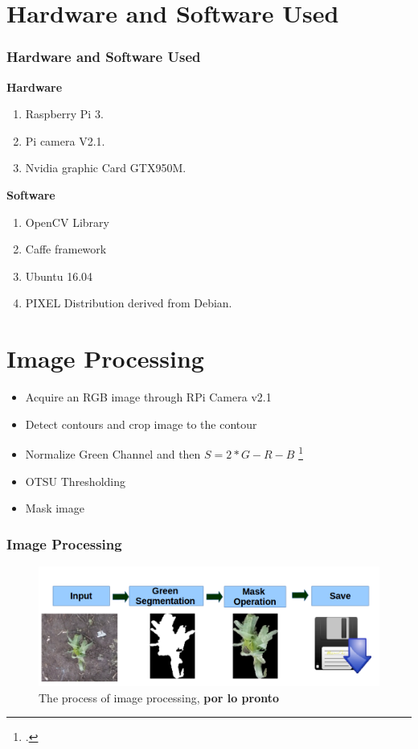 \documentclass[10pt,a4paper]{beamer}
\begin{document}
\section{Hardware and Software Used}
\begin{frame}
\frametitle{Hardware and Software Used}
\textbf{Hardware}
\begin{enumerate}
\item Raspberry Pi 3.
\item Pi camera V2.1.
\item Nvidia graphic Card GTX950M.
\end{enumerate}
\textbf{Software}
\begin{enumerate}
\item OpenCV Library
\item Caffe framework
\item Ubuntu 16.04
\item PIXEL Distribution derived from Debian.
\end{enumerate}
\end{frame}
\section{Image Processing}
\begin{frame}
\begin{itemize}
	\item Acquire  an RGB image through RPi Camera v2.1
	\item Detect contours and crop image to the contour
	\item Normalize Green Channel and then $S = 2*G - R - B$ \footcite{wang2013path}
	\item OTSU Thresholding
	\item Mask image
\end{itemize}
\frametitle{Image Processing}
	\begin{figure}[h]
	\centering
	\includegraphics[width=3.5 in]{procesamiento}
	\caption{The process of image processing,\textbf{ por lo pronto}}
	\label{figure4}
	\end{figure}
\end{frame}
\end{document}
